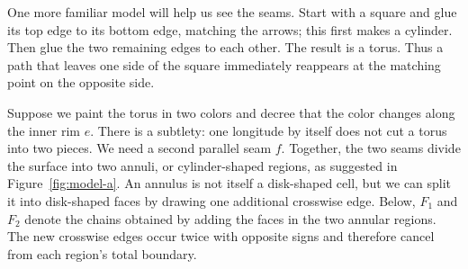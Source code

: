 \documentclass[12pt]{article}
\begin{document}
One more familiar model will help us see the seams.  Start with a square and
glue its top edge to its bottom edge, matching the arrows; this first makes a
cylinder.  Then glue the two remaining edges to each other.  The result is a
torus.  Thus a path that leaves one side of the square immediately reappears at
the matching point on the opposite side.

Suppose we paint the torus in two colors and decree that the color changes along
the inner rim \(e\).  There is a subtlety: one longitude by itself does not cut
a torus into two pieces.  We need a second parallel seam \(f\).  Together, the
two seams divide the surface into two annuli, or cylinder-shaped regions, as
suggested in Figure~\ref{fig:model-a}.  An annulus is not itself a disk-shaped
cell, but we can split it into disk-shaped faces by drawing one additional
crosswise edge.  Below, \(F_1\) and \(F_2\) denote the chains obtained by adding
the faces in the two annular regions.  The new crosswise edges occur twice with
opposite signs and therefore cancel from each region's total boundary.
\end{document}
